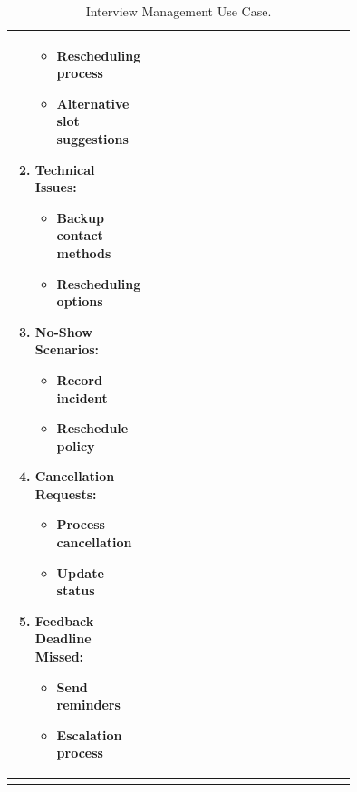 \begin{center}
\begin{longtable}{|l|p{0.75\linewidth}|}
\begin{enumerate}
            \begin{itemize}
                \item Rescheduling process
                \item Alternative slot suggestions
            \end{itemize}
            \item \textbf{Technical Issues:}
            \begin{itemize}
                \item Backup contact methods
                \item Rescheduling options
            \end{itemize}
            \item \textbf{No-Show Scenarios:}
            \begin{itemize}
                \item Record incident
                \item Reschedule policy
            \end{itemize}
            \item \textbf{Cancellation Requests:}
            \begin{itemize}
                \item Process cancellation
                \item Update status
            \end{itemize}
            \item \textbf{Feedback Deadline Missed:}
            \begin{itemize}
                \item Send reminders
                \item Escalation process
            \end{itemize}
        \end{enumerate} \\
        \hline
        \caption{Interview Management Use Case.}
        \label{tab:interview_management_use_case}
    \end{longtable}
\end{center}


